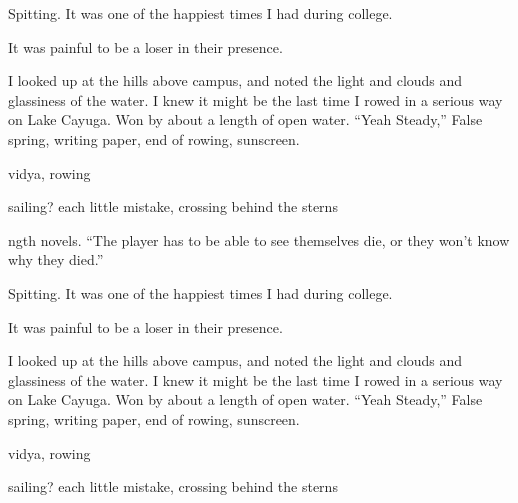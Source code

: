 	Spitting.  It was one of the happiest times I had during college.
	

It was painful to be a loser in their presence.  

I looked up at the hills above campus, and noted the light and clouds and
glassiness of the water.  I knew it might be the last time I rowed in a serious
way on Lake Cayuga.  Won by about a length of open water.  ``Yeah Steady,'' False
spring, writing paper, end of rowing, sunscreen.

vidya, rowing

 sailing?  each little mistake, crossing behind the sterns



	

ngth novels.  ``The player has to be able to see themselves die, or they won't
know why they died.'' 

	Spitting.  It was one of the happiest times I had during college.
	

It was painful to be a loser in their presence.  

I looked up at the hills above campus, and noted the light and clouds and
glassiness of the water.  I knew it might be the last time I rowed in a serious
way on Lake Cayuga.  Won by about a length of open water.  ``Yeah Steady,'' False
spring, writing paper, end of rowing, sunscreen.

vidya, rowing

 sailing?  each little mistake, crossing behind the sterns

